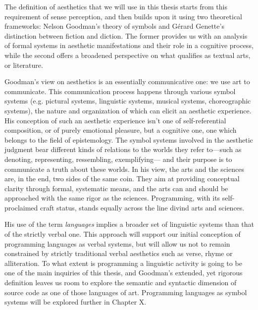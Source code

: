 The definition of aesthetics that we will use in this thesis starts from this requirement of sense perception, and then builds upon it using two theoretical frameworks: Nelson Goodman's theory of symbols\cite{goodman_languages_1976} and Gérard Genette's distinction between fiction and diction\cite{genette_fiction_1993}. The former provides us with an analysis of formal systems in aesthetic manifestations and their role in a cognitive process, while the second offers a broadened perspective on what qualifies as textual arts, or literature.

Goodman's view on aesthetics is an essentially communicative one: we use art to communicate. This communication process happens through various symbol systems (e.g. pictural systems, linguistic systems, musical systems, choreographic systems), the nature and organization of which can elicit an aesthetic experience. His conception of such an aesthetic experience isn't one of self-referential composition, or of purely emotional pleasure, but a cognitive one, one which belongs to the field of epistemology\cite{goodman_languages_1976}. The symbol systems involved in the aesthetic judgment bear different kinds of relations to the worlds they refer to—such as denoting, representing, ressembling, exemplifying— and their purpose is to communicate a truth about these worlds\cite{goodman_ways_1978}. In his view, the arts and the sciences are, in the end, two sides of the same coin. They aim at providing conceptual clarity through formal, systematic means, and the arts can and should be approached with the same rigor as the sciences. Programming, with its self-proclaimed craft status, stands equally across the line divind arts and sciences.

His use of the term \emph{languages} implies a broader set of linguistic systems than that of the strictly verbal one. This approach will support our initial conception of programming languages as verbal systems, but will allow us not to remain constrained by strictly traditional verbal aesthetics such as verse, rhyme or alliteration. To what extent is programming a linguistic activity is going to be one of the main inquiries of this thesis, and Goodman's extended, yet rigorous definition leaves us room to explore the semantic and syntactic dimension of source code as one of those languages of art. Programming languages as symbol systems will be explored further in Chapter X.

